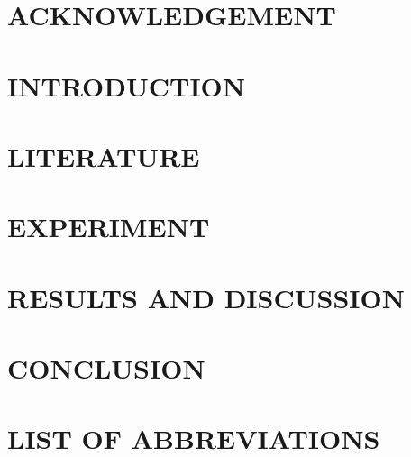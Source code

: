 \documentclass[a4paper,12pt]{article}
\begin{document}
\pagestyle{empty}



\newpage


\newpage
\section*{ACKNOWLEDGEMENT}


\newpage
\tableofcontents

\newpage
\pagestyle{plain}
\section{INTRODUCTION}

\label{kap:Introduction}
\clearpage

\newpage
\section{LITERATURE}

\label{kap:Literary part}
\clearpage

\newpage
\section{EXPERIMENT}

\label{kap:Experimental part}
\clearpage

\newpage
\section{RESULTS AND DISCUSSION}

\label{kap:Results}
\clearpage

\newpage
\section{CONCLUSION}

\label{kap:Conclusion}
\clearpage

\newpage
\section*{LIST OF ABBREVIATIONS}


\clearpage
\listoffigures

\clearpage
\listoftables

\newpage
\end{document}
